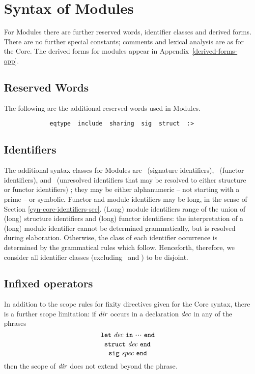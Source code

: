 \section{Syntax of Modules}
\label{syn-mod-sec}
For Modules there are further reserved words, identifier classes and derived
forms. There are no further special constants; 
comments and lexical analysis are as for the Core.
The derived forms for modules appear in 
Appendix~\ref{derived-forms-app}.


\subsection{Reserved Words}
The following are the additional reserved words used in Modules.

\begin{verbatim}
             eqtype  include  sharing  sig  struct  :>
\end{verbatim}
\subsection{Identifiers}
\label{syn-mod-identifiers-sec}
The additional syntax classes for Modules are \SigId\ (signature identifiers), \FunId\ (functor identifiers), and \ModId\ (unresolved identifiers that may be resolved to either structure or functor identifiers)
; they may be either alphanumeric -- not
starting with a prime -- or symbolic.  Functor and module identifiers
may be long, in the sense of Section \ref{cyn-core-identifiers-sec}.
(Long) module identifiers range of the union of (long) structure identifiers and (long) functor identifiers: the interpretation of a (long) module identifier cannot be determined grammatically, but
is resolved during elaboration.
Otherwise, the class of each identifier occurrence
is determined by the grammatical rules which follow.
Henceforth, therefore, we consider all identifier classes (excluding \ModId\ and \LongModId) to be disjoint.

\subsection{Infixed operators}
In addition to the scope rules for fixity directives given for the Core syntax,
there is a further scope limitation:
if ${\it dir}$ occurs in a declaration ${\it dec}$ in any of the 
phrases
\[ {\tt let}\ {\it dec}\ {\tt in}\ \mbox{$\cdot\!\cdot\!\cdot$}\ {\tt end} \]
\[ {\tt struct}\ {\it dec}\ {\tt end} \]
\[ {\tt sig}\ {\it spec}\ {\tt end} \]
then the scope of ${\it dir}$ does not extend beyond the phrase.

